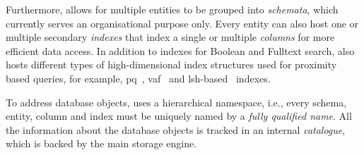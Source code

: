 Furthermore, \cottontail{} allows for multiple entities to be grouped into \emph{schemata}, which currently serves an organisational purpose only. Every entity can also host one or multiple secondary \emph{indexes} that index a single or multiple \emph{columns} for more efficient data access. In addition to indexes for Boolean and Fulltext search, \cottontail{} also hosts different types of high-dimensional index structures used for proximity based queries, for example, \acrshort{pq}~\cite{Jegou:2010Product}, \acrshort{vaf}~\cite{Weber:1998va} and \acrshort{lsh}-based~\cite{Indyk:1998lsh} indexes.

To address database objects, \cottontail{} uses a hierarchical namespace, i.e., every schema, entity, column and index must be uniquely named by a \emph{fully qualified name}. All the information about the database objects is tracked in an internal \emph{catalogue}, which is backed by the main storage engine.

